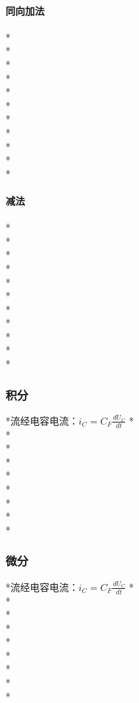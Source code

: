 \documentclass[UTF8, fontset=none]{ctexart}
\begin{document}
\begin{multicols*}{8}
\paragraph{同向加法}%
*\\
*\\
*\\
*\\
*\\
*\\
*\\
*\\
*\\
*\\
*
\paragraph{减法}%
*\\
*\\
*\\
*\\
*\\
*\\
*\\
*\\
*\\
*\\
*
\subsubsection{积分}
*流经电容电流：$i_C = C_F\frac{dU_C}{dt}$
*\\
*\\
*\\
*\\
*\\
*\\
*\\
*\\
*
\subsubsection{微分}
*流经电容电流：$i_C = C_F\frac{dU_C}{dt}$
*\\
*\\
*\\
*\\
*\\
*\\
*\\
*\\
*

\end{multicols*}
\end{document}
